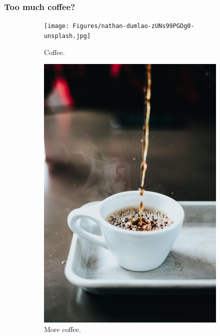 \documentclass[a4paper, 12pt]{article}
\begin{document}
\newpage
\subsubsection{Too much coffee?}
\begin{figure}
  \centering
  \begin{subfigure}[b]{0.3\linewidth}
    \texttt{[image: Figures/nathan-dumlao-zUNs99PGDg0-unsplash.jpg]}
     \caption{Coffee.}
  \end{subfigure}
  \begin{subfigure}[b]{0.3\linewidth}
    \includegraphics[width=\linewidth]{Figures/devin-avery-5iRgh_G0eRY-unsplash.jpg}
    \caption{More coffee.}
  \end{subfigure}
  \begin{subfigure}[b]{0.3\linewidth}

\end{subfigure}
\end{figure}
\end{document}
